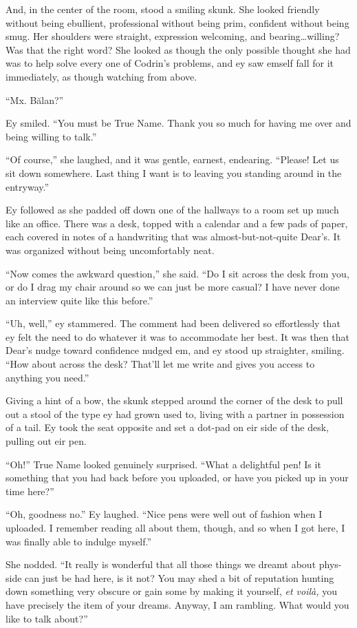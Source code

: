 And, in the center of the room, stood a smiling skunk. She looked friendly without being ebullient, professional without being prim, confident without being smug. Her shoulders were straight, expression welcoming, and bearing\ldots willing? Was that the right word? She looked as though the only possible thought she had was to help solve every one of Codrin's problems, and ey saw emself fall for it immediately, as though watching from above.

``Mx. Bălan?''

Ey smiled. ``You must be True Name. Thank you so much for having me over and being willing to talk.''

``Of course,'' she laughed, and it was gentle, earnest, endearing. ``Please! Let us sit down somewhere. Last thing I want is to leaving you standing around in the entryway.''

Ey followed as she padded off down one of the hallways to a room set up much like an office. There was a desk, topped with a calendar and a few pads of paper, each covered in notes of a handwriting that was almost-but-not-quite Dear's. It was organized without being uncomfortably neat.

``Now comes the awkward question,'' she said. ``Do I sit across the desk from you, or do I drag my chair around so we can just be more casual? I have never done an interview quite like this before.''

``Uh, well,'' ey stammered. The comment had been delivered so effortlessly that ey felt the need to do whatever it was to accommodate her best. It was then that Dear's nudge toward confidence nudged em, and ey stood up straighter, smiling. ``How about across the desk? That'll let me write and gives you access to anything you need.''

Giving a hint of a bow, the skunk stepped around the corner of the desk to pull out a stool of the type ey had grown used to, living with a partner in possession of a tail. Ey took the seat opposite and set a dot-pad on eir side of the desk, pulling out eir pen.

``Oh!'' True Name looked genuinely surprised. ``What a delightful pen! Is it something that you had back before you uploaded, or have you picked up in your time here?''

``Oh, goodness no.'' Ey laughed. ``Nice pens were well out of fashion when I uploaded. I remember reading all about them, though, and so when I got here, I was finally able to indulge myself.''

She nodded. ``It really is wonderful that all those things we dreamt about phys-side can just be had here, is it not? You may shed a bit of reputation hunting down something very obscure or gain some by making it yourself, \emph{et voilà,} you have precisely the item of your dreams. Anyway, I am rambling. What would you like to talk about?''

